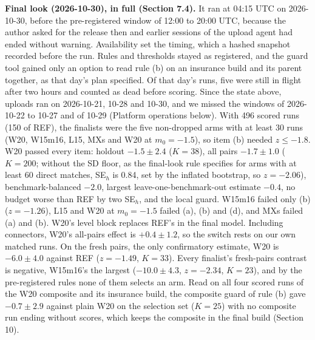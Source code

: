 \documentclass[
]{article}
\begin{document}
\textbf{Final look (2026-10-30), in full (Section 7.4).} It ran at 04:15
UTC on 2026-10-30, before the pre-registered window of 12:00 to 20:00
UTC, because the author asked for the release then and earlier sessions
of the upload agent had ended without warning. Availability set the
timing, which a hashed snapshot recorded before the run. Rules and
thresholds stayed as registered, and the guard tool gained only an
option to read rule (b) on an insurance build and its parent together,
as that day's plan specified. Of that day's runs, five were still in
flight after two hours and counted as dead before scoring. Since the
state above, uploads ran on 2026-10-21, 10-28 and 10-30, and we missed
the windows of 2026-10-22 to 10-27 and of 10-29 (Platform operations
below). With 496 scored runs (150 of REF), the finalists were the five
non-dropped arms with at least 30 runs (W20, W15m16, L15, MXs and W20 at
\(m_0 = -1.5\)), so item (b) needed \(z \le -1.8\). W20 passed every
item: holdout \(-1.5 \pm 2.4\) (\(K = 38\)), all pairs \(-1.7 \pm 1.0\)
(\(K = 200\); without the SD floor, as the final-look rule specifies for
arms with at least 60 direct matches, SE\(_h\) is 0.84, set by the
inflated bootstrap, so \(z = -2.06\)), benchmark-balanced \(-2.0\),
largest leave-one-benchmark-out estimate \(-0.4\), no budget worse than
REF by two SE\(_h\), and the local guard. W15m16 failed only (b)
(\(z = -1.26\)), L15 and W20 at \(m_0 = -1.5\) failed (a), (b) and (d),
and MXs failed (a) and (b). W20's level block replaces REF's in the
final model. Including connectors, W20's all-pairs effect is
\(+0.4 \pm 1.2\), so the switch rests on our own matched runs. On the
fresh pairs, the only confirmatory estimate, W20 is \(-6.0 \pm 4.0\)
against REF (\(z = -1.49\), \(K = 33\)). Every finalist's fresh-pairs
contrast is negative, W15m16's the largest (\(-10.0 \pm 4.3\),
\(z = -2.34\), \(K = 23\)), and by the pre-registered rules none of them
selects an arm. Read on all four scored runs of the W20 composite and
its insurance build, the composite guard of rule (b) gave
\(-0.7 \pm 2.9\) against plain W20 on the selection set (\(K = 25\))
with no composite run ending without scores, which keeps the composite
in the final build (Section 10).
\end{document}
